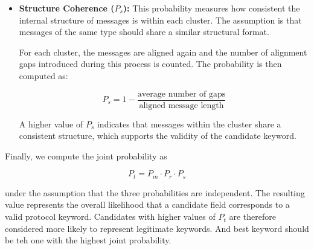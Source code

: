 \begin{itemize}
The computation proceeds as follows:

\begin{enumerate}
\item Client-to-server messages are clustered.
\item Server-to-client messages are clustered independently.
\item Messages are then paired according to their TCP session order.
\end{enumerate}

For each client cluster we define:
\begin{itemize}
\item $N$: the number of client messages in the cluster.
\item $M$: the largest number of corresponding server responses that belong to the same server cluster.
\end{itemize}

The remote coupling probability is then defined as:

\[
P_r = \frac{M}{N}
\]

A high value of $P_r$ indicates strong correspondence between client requests and server responses, suggesting that the candidate keyword correctly separates different message types.

\item \textbf{Structure Coherence ($P_s$):}  
This probability measures how consistent the internal structure of messages is within each cluster. The assumption is that messages of the same type should share a similar structural format.

For each cluster, the messages are aligned again and the number of alignment gaps introduced during this process is counted. The probability is then computed as:

\[
P_s = 1 - \frac{\text{average number of gaps}}{\text{aligned message length}}
\]

A higher value of $P_s$ indicates that messages within the cluster share a consistent structure, which supports the validity of the candidate keyword.

\end{itemize}

Finally, we compute the joint probability as

\[
P_t = P_m \cdot P_r \cdot P_s
\]

under the assumption that the three probabilities are independent. The resulting value represents the overall likelihood that a candidate field corresponds to a valid protocol keyword. Candidates with higher values of $P_t$ are therefore considered more likely to represent legitimate keywords. And best keyword should be teh one with the highest joint probability.

